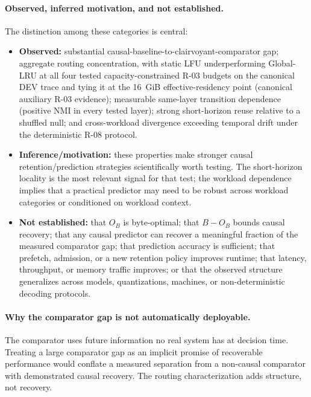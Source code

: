 \paragraph{Observed, inferred motivation, and not established.}
The distinction among these categories is central:
\begin{itemize}
 \item \textbf{Observed:} substantial causal-baseline-to-clairvoyant-comparator
   gap; aggregate routing concentration, with static LFU
   underperforming Global-LRU at all four tested capacity-constrained
   R-03 budgets on the canonical DEV trace and tying it at the 16~GiB
   effective-residency point (canonical auxiliary R-03 evidence);
   measurable same-layer transition dependence (positive NMI in every
   tested layer); strong short-horizon reuse relative to a shuffled null;
   and cross-workload divergence exceeding temporal drift under the
   deterministic R-08 protocol.
 \item \textbf{Inference/motivation:} these properties make stronger
   causal retention/prediction strategies scientifically worth testing.
   The short-horizon locality is the most relevant signal for that test;
   the workload dependence implies that a practical predictor may need to
   be robust across workload categories or conditioned on workload
   context.
 \item \textbf{Not established:} that $O_B$ is byte-optimal; that $B-O_B$
   bounds causal recovery; that any causal predictor can recover a
   meaningful fraction of the measured comparator gap; that prediction
   accuracy is sufficient; that prefetch, admission, or a new retention
   policy improves runtime; that latency, throughput, or memory traffic
   improves; or that the observed structure generalizes across models,
   quantizations, machines, or non-deterministic decoding protocols.
\end{itemize}

\paragraph{Why the comparator gap is not automatically deployable.} The
comparator uses future information no real system has at decision time.
Treating a large comparator gap as an implicit promise of recoverable
performance would conflate a measured separation from a non-causal
comparator with demonstrated causal recovery. The routing characterization
adds structure, not recovery.

